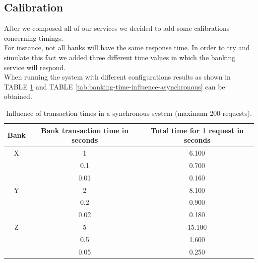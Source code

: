 \documentclass[conference]{IEEEtran}
\begin{document}
\subsection{Calibration}
After we composed all of our services we decided to add some calibrations concerning timings.\\
For instance, not all banks will have the same response time. In order to try and simulate this fact we added three different time values in which the banking service will respond. \\
When running the system with different configurations results as shown in TABLE \ref{tab:banking-time-influence-synchronous} and TABLE \ref{tab:banking-time-influence-asynchronous} can be obtained.

\begin{center}
	\begin{table}[]
		\begin{tabular}{c|c|c}
			Bank				& Bank transaction time in seconds & Total time for 1 request in seconds\\\hline
			X					 & 1 						  & 6.100 \\
			& 0.1 						& 0.700 \\
			& 0.01 					   & 0.160 \\\hline
			Y				   & 2 							& 8.100 \\
			& 0.2 						&  0.900\\
			& 0.02 					   & 0.180 \\\hline
			Z				   & 5 							& 15.100 \\
			& 0.5 						&  1.600\\
			& 0.05 					   & 0.250
		\end{tabular}
		\caption{\label{tab:banking-time-influence-synchronous}Influence of transaction times in a synchronous system (maximum 200 requests).}
	\end{table}
\end{center}

\noindent
\end{document}
